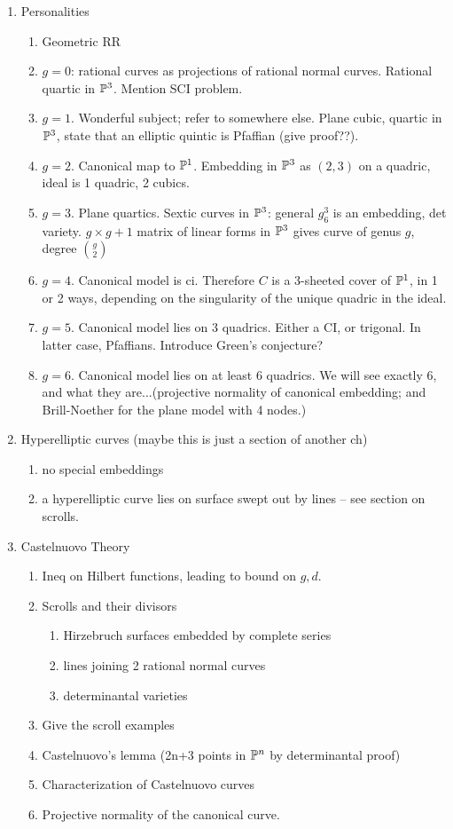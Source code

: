 \documentclass[12pt, leqno]{article}
\begin{document}
\begin{enumerate}
\item Personalities
\begin{enumerate}
\item Geometric RR
\item $g=0$: rational curves as projections of rational normal curves. Rational quartic in ${\mathbb P}^3$. Mention SCI problem.
\item $g=1$. Wonderful subject; refer to somewhere else. Plane cubic, quartic in ${\mathbb P}^3$, state that an elliptic quintic is Pfaffian (give proof??).
\item $g=2$. Canonical map to ${\mathbb P}^1$. Embedding in ${\mathbb P}^3$ as $(2,3)$ on a quadric, ideal is 1 quadric, 2 cubics.
\item $g=3$. Plane quartics. Sextic curves in ${\mathbb P}^3$: general $g^3_6$ is an embedding, det variety.  $g\times g+1$ matrix of linear forms in ${\mathbb P}^3$ gives curve of genus $g$, degree ${g\choose 2}$
\item $g=4$. Canonical model is ci. Therefore $C$ is a 3-sheeted cover of ${\mathbb P}^1$, in 1 or 2 ways, depending on the singularity of the unique quadric in the ideal.
\item $g=5$. Canonical model lies on 3 quadrics. Either a CI, or trigonal. In latter case, Pfaffians. Introduce Green's conjecture?
\item $g=6$. Canonical model lies on at least 6 quadrics. We will see exactly 6, and what they are...(projective normality of canonical embedding; and Brill-Noether for the plane model with 4 nodes.)
\end{enumerate}

\item Hyperelliptic curves (maybe this is just a section of another ch)
\begin{enumerate}
\item no special embeddings
\item a hyperelliptic curve lies on surface swept out by lines -- see section on scrolls.
\end{enumerate}

\item Castelnuovo Theory
\begin{enumerate}
\item Ineq on Hilbert functions, leading to bound on $g,d$. 
\item Scrolls and their divisors
\begin{enumerate}
 \item Hirzebruch surfaces embedded by complete series
 \item lines joining 2 rational normal curves
 \item determinantal varieties
\end{enumerate}
\item Give the scroll examples
\item Castelnuovo's lemma (2n+3 points in ${\mathbb P}^n$ by determinantal proof) 
\item Characterization of Castelnuovo curves
\item Projective normality of the canonical curve.
\end{enumerate}


\end{enumerate}
\end{document}
